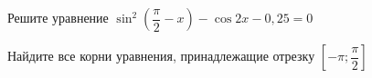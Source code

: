 \begin{ex}
	\begin{condition}
		\begin{enumcols}[label=\asbuk*)]
			\item Решите уравнение \( \sin^2{\left(\dfrac{\pi}{2}-x\right)}  - \cos 2x - 0,25= 0 \)
			\item Найдите все корни уравнения, принадлежащие отрезку \( \left[-\pi;\dfrac{\pi}{2}\right]  \)
		\end{enumcols}
	\end{condition}
\end{ex}